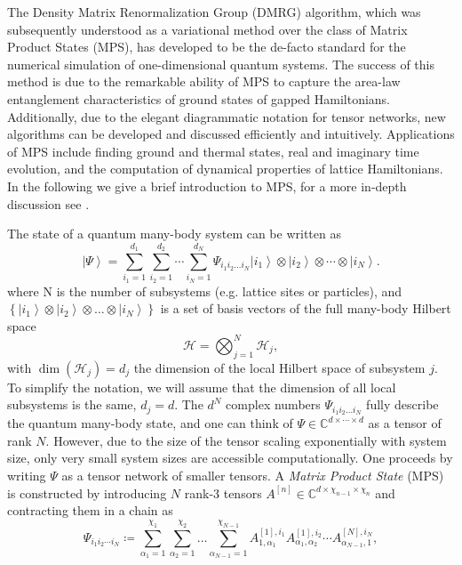 The Density Matrix Renormalization Group (DMRG) algorithm, which was subsequently understood as a variational method over the class of Matrix Product States (MPS), has developed to be the de-facto standard for the numerical simulation of one-dimensional quantum systems. The success of this method is due to the remarkable ability of MPS to capture the area-law entanglement characteristics of ground states of gapped Hamiltonians. Additionally, due to the elegant diagrammatic notation for tensor networks, new algorithms can be developed and discussed efficiently and intuitively. Applications of MPS include finding ground and thermal states, real and imaginary time evolution, and the computation of dynamical properties of lattice Hamiltonians. In the following we give a brief introduction to MPS, for a more in-depth discussion see \cite{cite:DMRG_in_the_age_of_MPS, cite:practical_introduction_MPS_and_PEPS, cite:tenpy}. \par
The state of a quantum many-body system can be written as
\begin{equation}
	\left|\Psi\right\rangle = \sum_{i_1=1}^{d_1} \sum_{i_2=1}^{d_2} \cdots \sum_{i_N=1}^{d_N} \Psi_{i_1i_2\dots i_N} \left|i_1\right\rangle \otimes \left|i_2\right\rangle \otimes \cdots \otimes \left|i_N\right\rangle.
\end{equation}
where N is the number of subsystems (e.g. lattice sites or particles), and $\left\{\left|i_1\right\rangle \otimes \left|i_2\right\rangle \otimes \dots \otimes \left|i_N\right\rangle\right\}$ is a set of basis vectors of the full many-body Hilbert space
\begin{equation}
	\mathcal{H} = \bigotimes_{j=1}^{N} \mathcal{H}_j,
\end{equation}
with $\dim\left(\mathcal{H}_j\right) = d_j$ the dimension of the local Hilbert space of subsystem $j$. To simplify the notation, we will assume that the dimension of all local subsystems is the same, $d_j = d$. The $d^N$ complex numbers $\Psi_{i_1i_2\dots i_N}$ fully describe the quantum many-body state, and one can think of $\Psi\in\mathbb{C}^{d\times\cdots\times d}$ as a tensor of rank $N$. However, due to the size of the tensor scaling exponentially with system size, only very small system sizes are accessible computationally. One proceeds by writing $\Psi$ as a tensor network of smaller tensors. A \textit{Matrix Product State} (MPS) is constructed by introducing $N$ rank-3 tensors $A^{[n]}\in\mathbb{C}^{d\times \chi_{n-1}\times \chi_{n}}$ and contracting them in a chain as
\begin{equation}
	\label{eq:MPS_open_boundary_conditions_general_definition}
	\Psi_{i_1i_2\cdots i_N} \coloneqq \sum_{\alpha_1=1}^{\chi_1} \sum_{\alpha_2=1}^{\chi_2}\dots\sum_{\alpha_{N-1}=1}^{\chi_{N-1}}A^{[1],i_1}_{1,\alpha_1} A^{[1],i_2}_{\alpha_1,\alpha_2} \cdots A^{[N],i_N}_{\alpha_{N-1},1},
\end{equation}

